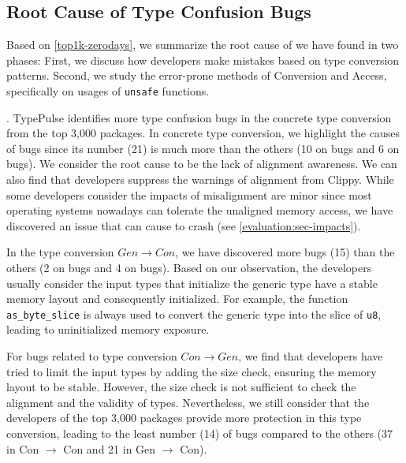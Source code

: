 \begin{appendix}
\section{Root Cause of Type Confusion Bugs} \label{evaluation:rootcause}
Based on \autoref{top1k-zerodays}, we summarize the root cause of \bugs we have found in two phases: First, we discuss how developers make mistakes based on type conversion patterns. 
Second, we study the error-prone methods of {\bf {}} Conversion and {\bf {}} Access, specifically on usages of \texttt{unsafe} functions.


\vspace{0.05in}
.
{{TypePulse identifies more type confusion bugs in the concrete type conversion from the top 3,000 packages.} In concrete type conversion, we highlight the causes of \bone bugs since its number ({21}) is much more than the others ({10} on \btwo bugs and {6} on \bthree bugs). 
We consider the root cause to be the lack of alignment awareness. 
We can also find that developers 
suppress the warnings of alignment from Clippy\cite{clippy}.
While some developers consider the impacts of misalignment are minor since most operating systems nowadays can tolerate the unaligned memory access, we have discovered an issue that can cause to crash (see \autoref{evaluation:sec-impacts})}.

\vspace{0.05in}
{ In the type conversion $Gen \rightarrow Con$, we have discovered more \btwo bugs (15) than the others (2 on \bone bugs and {4} on \bthree bugs). 
Based on our observation, the developers usually consider the input types that initialize the generic type have a stable memory layout and consequently initialized.
For example, the function \texttt{as\_byte\_slice} is always used to convert the generic type into the slice of \texttt{u8}, leading to uninitialized memory exposure}.

\vspace{0.05in}
{For bugs related to type conversion $Con \rightarrow Gen$, we find that developers have tried to limit the input types by adding the size check, ensuring the memory layout to be stable. However, the size check is not sufficient to check the alignment and the validity of types.
Nevertheless, we still consider that the developers of the top 3,000 packages provide more protection in this type conversion, leading to the least number ({14}) of bugs compared to the others ({37} in Con $\rightarrow$ Con and {21} in Gen $\rightarrow$ Con)}. 


\end{appendix}
